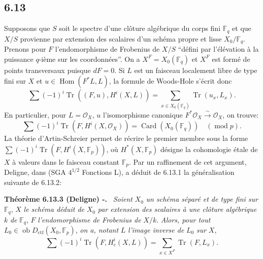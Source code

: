 \documentclass[11pt]{article}
\newenvironment{statement}[1]{\par\medskip\noindent\textbf{#1.}\ }{\par\medskip}
\DeclareMathOperator{\Hom}{Hom}
\newcommand{\ob}{\operatorname{ob}}
\providecommand{\ctf}{\mathrm{ctf}}
\providecommand{\OO}{\mathcal{O}}
\providecommand{\Hom}{\operatorname{Hom}}
\providecommand{\ob}{\operatorname{ob}}
\providecommand{\Hom}{\operatorname{Hom}}
\begin{document}
\subsection*{6.13}
Supposons que $S$ soit le spectre d'une clôture algébrique du corps fini $\mathbb F_q$ et que $X/S$ provienne par extension des scalaires d'un schéma propre et lisse $X_0/\mathbb F_q$. Prenons pour $F$ l'endomorphisme de Frobenius de $X/S$ ``défini par l'élévation à la puissance $q$-ième sur les coordonnées''. On a $X^F=X_0(\mathbb F_q)$ et $X^F$ est formé de points transversaux puisque $dF=0$. Si $L$ est un faisceau localement libre de type fini sur $X$ et $u\in\Hom(F^*L,L)$, la formule de Woods-Hole s'écrit donc
\begin{equation}
\tag{6.13.1}
\sum(-1)^i\operatorname{Tr}((F,u),H^i(X,L))=
\sum_{x\in X_0(\mathbb F_q)}\operatorname{Tr}(u_x,L_x).
\end{equation}
En particulier, pour $L=\OO_X$, $u$ l'isomorphisme canonique $F^*\OO_X\xrightarrow{\sim}\OO_X$, on trouve:
\begin{equation}
\tag{6.13.2}
\sum(-1)^i\operatorname{Tr}(F,H^i(X,\OO_X))=\operatorname{Card}(X_0(\mathbb F_q))\quad(\operatorname{mod} p).
\end{equation}
La théorie d'Artin-Schreier permet de récrire le premier membre sous la forme $\sum(-1)^i\operatorname{Tr}(F,H^i(X,\mathbb F_p))$, où $H^*(X,\mathbb F_p)$ désigne la cohomologie étale de $X$ à valeurs dans le faisceau constant $\mathbb F_p$. Par un raffinement de cet argument, Deligne, dans (SGA $4^{1/2}$ Fonctions L), a déduit de 6.13.1 la généralisation suivante de 6.13.2:


\begin{statement}{Théorème 6.13.3 (Deligne) -}
\emph{Soient} $X_0$ \emph{un schéma séparé et de type fini sur} $\mathbb F_q$, $X$ \emph{le schéma déduit de} $X_0$ \emph{par extension des scalaires à une clôture algébrique} $k$ \emph{de} $\mathbb F_q$, $F$ \emph{l'endomorphisme de Frobenius de} $X/k$. \emph{Alors, pour tout} $L_0\in\ob D_{\ctf}(X_0,\mathbb F_p)$, \emph{on a, notant} $L$ \emph{l'image inverse de} $L_0$ \emph{sur} $X$,
\[
\sum(-1)^i\operatorname{Tr}(F,H_c^i(X,L))=
\sum_{x\in X^F}\operatorname{Tr}(F,L_x).
\]
\end{statement}
\end{document}
